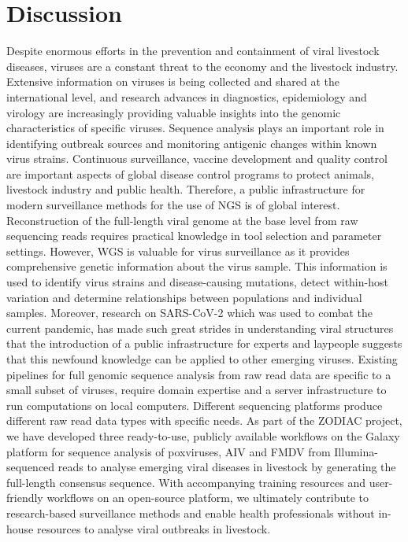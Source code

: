 \chapter{Discussion}\label{chap:discussion}
Despite enormous efforts in the prevention and containment of viral livestock diseases, viruses are a constant threat to the economy and the livestock industry. Extensive information on viruses is being collected and shared at the international level, and research advances in diagnostics, epidemiology and virology are increasingly providing valuable insights into the genomic characteristics of specific viruses. Sequence analysis plays an important role in identifying outbreak sources and monitoring antigenic changes within known virus strains. Continuous surveillance, vaccine development and quality control are important aspects of global disease control programs to protect animals, livestock industry and public health. Therefore, a public infrastructure for modern surveillance methods for the use of \ac{NGS} is of global interest. Reconstruction of the full-length viral genome at the base level from raw sequencing reads requires practical knowledge in tool selection and parameter settings. However, \ac{WGS} is valuable for virus surveillance as it provides comprehensive genetic information about the virus sample. This information is used to identify virus strains and disease-causing mutations, detect within-host variation and determine relationships between populations and individual samples. Moreover, research on \ac{SARS-CoV-2} which was used to combat the current pandemic, has made such great strides in understanding viral structures that the introduction of a public infrastructure for experts and laypeople suggests that this newfound knowledge can be applied to other emerging viruses. Existing pipelines for full genomic sequence analysis from raw read data are specific to a small subset of viruses, require domain expertise and a server infrastructure to run computations on local computers. Different sequencing platforms produce different raw read data types with specific needs. As part of the \ac{ZODIAC} project, we have developed three ready-to-use, publicly available workflows on the Galaxy platform for sequence analysis of poxviruses, \ac{AIV} and \ac{FMDV} from Illumina-sequenced reads to analyse emerging viral diseases in livestock by generating the full-length consensus sequence. With accompanying training resources and user-friendly workflows on an open-source platform, we ultimately contribute to research-based surveillance methods and enable health professionals without in-house resources to analyse viral outbreaks in livestock.

